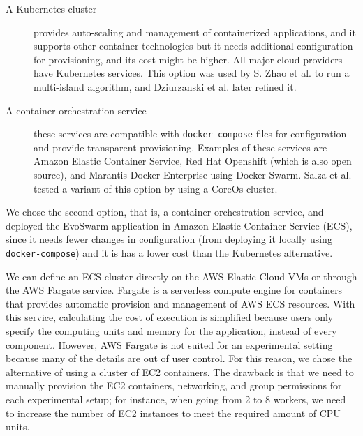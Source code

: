 \documentclass[review]{elsarticle}
\begin{document}
\begin{description}
  
  \item[A Kubernetes cluster] provides auto-scaling and management of
  containerized applications, and it supports other container technologies 
  but it needs additional configuration for provisioning, 
  and its cost might be higher. All major cloud-providers have Kubernetes services. This option
  was used by S. Zhao et al. \cite{zhao2019cloud} to run a multi-island
  algorithm, and Dziurzanski et al. \cite{dziurzanski2020scalable} later refined
  it.

  \item[A container orchestration service] these services are compatible with {\tt docker-compose}
    files for configuration and provide transparent provisioning. Examples of these
    services are Amazon Elastic Container Service,  Red Hat Openshift
    (which is also open source), and Marantis Docker Enterprise using Docker Swarm.
    Salza et al. \cite{salza2019speed} tested a variant of this option by using a CoreOs cluster. 

\end{description}


We chose the second option, that is, a container orchestration service, and
deployed the EvoSwarm application in Amazon Elastic Container Service (ECS),
since it needs fewer changes in configuration (from deploying it locally using
{\tt docker-compose}) and it is has a lower cost than the Kubernetes
alternative.

We can define an ECS cluster directly on the AWS Elastic Cloud VMs or through the
AWS Fargate service. Fargate is a serverless compute engine for containers that
provides automatic provision and management of AWS ECS resources. With this
service, calculating the cost of execution is simplified because users only
specify the computing units and memory for the application, instead of every
component. However, AWS Fargate is not suited for an experimental setting because
many of the details are out of user control. For this reason, we chose the
alternative of using a cluster of EC2 containers. The drawback is that we need to manually
provision the  EC2 containers, networking, and group permissions for each
experimental setup; for instance, when going from 2 to 8 workers, we need to increase the
number of EC2 instances to meet the required amount of CPU units.
\end{document}
